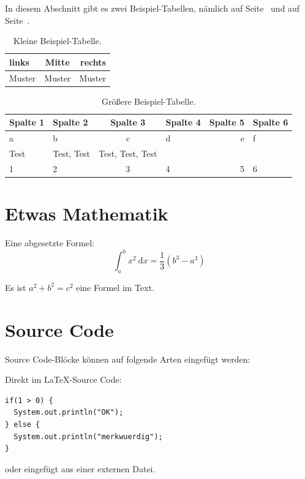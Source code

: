 In diesem Abschnitt gibt es zwei Beispiel-Tabellen, nämlich auf Seite~\pageref{tab:BeispielTabelleKlein} und auf Seite~\pageref{tab:BeispielTabelleGroesser}.

\begin{table}[htb]
    \centering
    \begin{tabular}{lcr}
        links  & Mitte  & rechts \\
        \hline
        Muster & Muster & Muster \\
    \end{tabular}
    \caption{Kleine Beispiel-Tabelle.}
    \label{tab:BeispielTabelleKlein}
\end{table}

\begin{table}[htb]
    \centering
    \begin{tabular}{|l|l|c|l|r||l}
        \textbf{Spalte 1} & \textbf{Spalte 2} & \textbf{Spalte 3} & \textbf{Spalte 4} & \textbf{Spalte 5} & \textbf{Spalte 6} \\
        \hline
        a                 & b                 & c                 & d                 & e                 & f                 \\
        Test              & Test, Test        & Test, Test, Test  & ~                 & ~                 & ~                 \\
        1                 & 2                 & 3                 & 4                 & 5                 & 6                 \\
    \end{tabular}
    \caption{Größere Beispiel-Tabelle.}
    \label{tab:BeispielTabelleGroesser}
\end{table}

\section{Etwas Mathematik}

Eine abgesetzte Formel:
\[
    \int_a^b x^2 \: \mathrm{d} x = \frac{1}{3} (b^3 - a^3)
\]

Es ist $a^2+b^2 = c^2$ eine Formel im Text.

\section{Source Code}

Source Code-Blöcke können auf folgende Arten eingefügt werden:

\lstset{language=Java}

Direkt im \LaTeX-Source Code:
\begin{lstlisting}
if(1 > 0) {
  System.out.println("OK"); 
} else {
  System.out.println("merkwuerdig");
}
\end{lstlisting}

oder eingefügt aus einer externen Datei.
